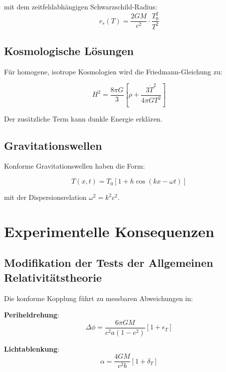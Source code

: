 \documentclass[12pt,a4paper]{report}
\begin{document}
	mit dem zeitfeldabhängigen Schwarzschild-Radius:
	\begin{equation}
		r_s(T) = \frac{2GM}{c^2} \cdot \frac{T_0^2}{T^2}
	\end{equation}
	
	\subsection{Kosmologische Lösungen}
	
	Für homogene, isotrope Kosmologien wird die Friedmann-Gleichung zu:
	
	\begin{equation}
		H^2 = \frac{8\pi G}{3}\left[\rho + \frac{3\dot{T}^2}{4\pi G T^2}\right]
	\end{equation}
	
	Der zusätzliche Term kann dunkle Energie erklären.
	
	\subsection{Gravitationswellen}
	
	Konforme Gravitationswellen haben die Form:
	
	\begin{equation}
		T(x,t) = T_0[1 + h \cos(kx - \omega t)]
	\end{equation}
	
	mit der Dispersionsrelation $\omega^2 = k^2c^2$.
	
	\section{Experimentelle Konsequenzen}
	
	\subsection{Modifikation der Tests der Allgemeinen Relativitätstheorie}
	
	Die konforme Kopplung führt zu messbaren Abweichungen in:
	
	\textbf{Periheldrehung}:
	\begin{equation}
		\Delta\phi = \frac{6\pi GM}{c^2 a(1-e^2)} \left[1 + \epsilon_T\right]
	\end{equation}
	
	\textbf{Lichtablenkung}:
	\begin{equation}
		\alpha = \frac{4GM}{c^2 b} \left[1 + \delta_T\right]
	\end{equation}
	
\end{document}
